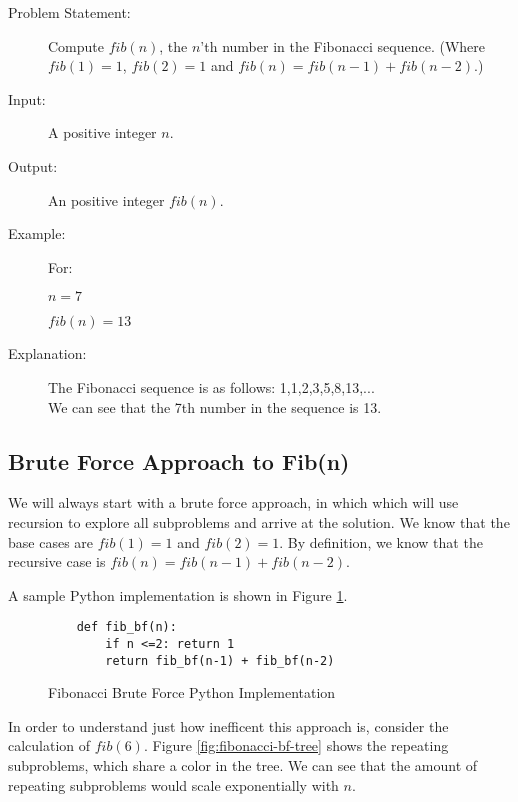 \begin{description}
    \item[Problem Statement:]
        Compute $fib(n)$, the $n$'th number in the Fibonacci sequence. (Where $fib(1) = 1$, $fib(2) = 1$ and $fib(n) = fib(n-1) + fib(n-2)$.)
        
    \item[Input:] 
        A positive integer $n$.
        
    \item[Output:] 
        An positive integer $fib(n)$.
        
    \item[Example:]
        For: 

        $n = 7$
        
        $fib(n) = 13$

    \item[Explanation:]
        The Fibonacci sequence is as follows: 1,1,2,3,5,8,13,...\\
        We can see that the 7th number in the sequence is 13.

\end{description}


\subsection{Brute Force Approach to Fib(n)}

We will always start with a brute force approach, in which which will use recursion to explore all subproblems and arrive at the solution. 
We know that the base cases are $fib(1) = 1$ and $fib(2) = 1$.
By definition, we know that the recursive case is $fib(n) = fib(n-1) + fib(n-2)$.

A sample Python implementation is shown in Figure \ref{fig:fibonacci-bf}.

\begin{figure}[H]
    \centering
    \begin{lstlisting}
    def fib_bf(n):
        if n <=2: return 1
        return fib_bf(n-1) + fib_bf(n-2)
    \end{lstlisting}
    \caption{Fibonacci Brute Force Python Implementation}
    \label{fig:fibonacci-bf}
\end{figure}

In order to understand just how inefficent this approach is, consider the calculation of $fib(6)$.
Figure \ref{fig:fibonacci-bf-tree} shows the repeating subproblems, which share a color in the tree.
We can see that the amount of repeating subproblems would scale exponentially with $n$.

